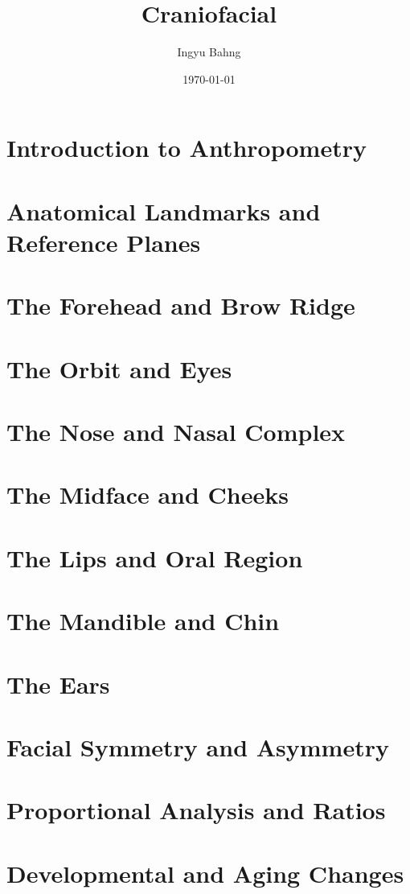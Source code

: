 \documentclass[10pt]{article}
\title{Craniofacial}
\date{\today}
\author{Ingyu Bahng}
\begin{document}


\section{Introduction to Anthropometry}

\section{Anatomical Landmarks and Reference Planes}

\section{The Forehead and Brow Ridge}

\section{The Orbit and Eyes}

\section{The Nose and Nasal Complex}

\section{The Midface and Cheeks}

\section{The Lips and Oral Region}

\section{The Mandible and Chin}

\section{The Ears}

\section{Facial Symmetry and Asymmetry}

\section{Proportional Analysis and Ratios}

\section{Developmental and Aging Changes}
\end{document}
